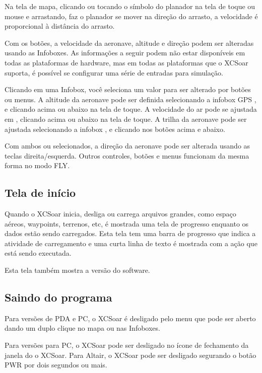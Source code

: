 Na tela de mapa, clicando ou tocando o símbolo do planador na tela de toque ou mouse e arrastando, faz o planador se mover na direção do arrasto, a velocidade é proporcional à distância do arrasto.

Com os botões, a velocidade da aeronave, altitude e direção podem ser alteradas usando as Infoboxes.  As informações a seguir podem não estar disponíveis em todas as plataformas de hardware, mas em todas as plataformas que o XCSoar suporta, é possível se configurar uma série de entradas para simulação.

Clicando em uma Infobox, você seleciona um valor para ser alterado por botões ou menus.
A altitude da aeronave pode ser definida selecionando a infobox GPS , e clicando acima ou abaixo na tela de toque.  A velocidade do ar pode se ajustada em , clicando acima ou abaixo na tela de toque.  A trilha da aeronave pode ser ajustada selecionando a infobox , e clicando nos botões acima e abaixo.

Com ambos  ou 
selecionados, a direção da aeronave pode ser alterada usando as teclas direita/esquerda.
Outros controles, botões e menus funcionam da mesma forma no modo FLY.


\subsection*{Tela de início}
Quando o XCSoar inicia, desliga ou carrega arquivos grandes, como espaço aéreos, waypoints, terrenos, etc, é mostrada uma tela de progresso enquanto os dados estão sendo carregados.  Esta tela tem uma barra de progresso que indica a atividade de carregamento e uma curta linha de texto é mostrada com a ação que está sendo executada.

Esta tela também mostra a versão do software.

\subsection*{Saindo do programa}
Para versões de PDA e PC, o XCSoar é desligado pelo menu que  pode ser aberto dando um duplo clique no mapa ou nas Infoboxes.
\begin{quote}
\end{quote}

Para versões para PC, o XCSoar pode ser desligado no ícone de fechamento da janela do o XCSoar.
Para Altair, o XCSoar pode ser desligado segurando o botão PWR por dois segundos ou mais. 

